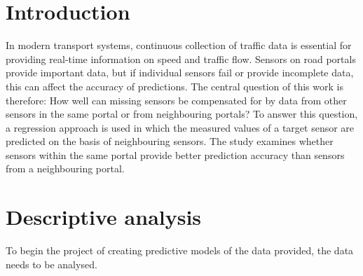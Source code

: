 	\section{Introduction}
	In modern transport systems, continuous collection of traffic data is essential for providing real-time information on speed and traffic flow. Sensors on road portals provide important data, but if individual sensors fail or provide incomplete data, this can affect the accuracy of predictions. The central question of this work is therefore: How well can missing sensors be compensated for by data from other sensors in the same portal or from neighbouring portals?
	To answer this question, a regression approach is used in which the measured values of a target sensor are predicted on the basis of neighbouring sensors. The study examines whether sensors within the same portal provide better prediction accuracy than sensors from a neighbouring portal. 
	
	\section{Descriptive analysis}
	To begin the project of creating predictive models of the data provided, the data needs to be analysed.
	
